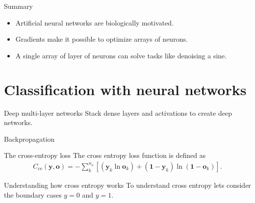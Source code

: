 \documentclass[notes]{beamer}
\begin{document}
    \begin{frame}{Summary}
      \begin{itemize}
        \item Artificial neural networks are biologically motivated.
        \item Gradients make it possible to optimize arrays of neurons.
        \item A single array of layer of neurons can solve tasks like denoising a sine.
      \end{itemize}
    \end{frame}


    \section{Classification with neural networks}

    \begin{frame}{Deep multi-layer networks}
      Stack dense layers and activations to create deep networks. \\
      \begin{figure}
         
      \end{figure}
    \end{frame}

    \begin{frame}{Backpropagation}
      \begin{figure}
         
      \end{figure}
    \end{frame}

    \begin{frame}{The cross-entropy loss}
      The cross entropy loss function is defined as \cite{nielsen2015neural, bishop2006pattern}
      \begin{align} \label{eq:ce}
       C_{\text{ce}}(\mathbf{y}, \mathbf{o}) = -\sum_k^{n_o} [( \mathbf{y}_k  \ln \mathbf{o}_k) 
                                  + (\mathbf{1} - \mathbf{y}_k)
                                     \ln(\mathbf{1} - \mathbf{o}_k)].
      \end{align}
    \end{frame}

    \begin{frame}{Understanding how cross entropy works}
      To understand cross entropy lets consider the boundary cases $y=0$ and $y=1$.
      \begin{figure}
        
        
      \end{figure}
    \end{frame}
\end{document}
